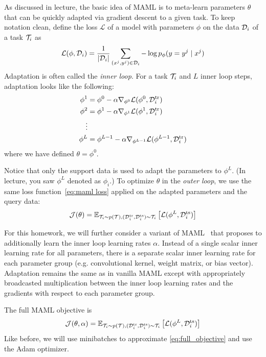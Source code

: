 As discussed in lecture, the basic idea of MAML is to meta-learn parameters $\theta$ that can be quickly adapted via gradient descent to a given task. To keep notation clean, define the loss $\mathcal{L}$ of a model with parameters $\phi$ on the data $\mathcal{D}_i$ of a task $\mathcal{T}_i$ as
\begin{equation}\label{eq:maml loss}
    \mathcal{L}(\phi, \mathcal{D}_i) = \frac{1}{\lvert \mathcal{D}_i \rvert} \sum_{(x^j, y^j) \in \mathcal{D}_i} -\log p_\phi (y = y^j \mid x^j)
\end{equation}
Adaptation is often called the \emph{inner loop}. For a task $\mathcal{T}_i$ and $L$ inner loop steps, adaptation looks like the following:
\begin{equation}
\begin{aligned}
    \phi^1 &= \phi^0 - \alpha \nabla_{\phi^0} \mathcal{L}(\phi^0, \mathcal{D}^\mathrm{tr}_i) \\
    \phi^2 &= \phi^1 - \alpha \nabla_{\phi^1} \mathcal{L}(\phi^1, \mathcal{D}^\mathrm{tr}_i) \\
    \vdots \\
    \phi^L &= \phi^{L-1} - \alpha \nabla_{\phi^{L-1}} \mathcal{L}(\phi^{L-1}, \mathcal{D}^\mathrm{tr}_i)
\end{aligned}
\end{equation}
where we have defined $\theta = \phi^0$.


Notice that only the support data is used to adapt the parameters to $\phi^L$. (In lecture, you saw $\phi^L$ denoted as $\phi_i$.) To optimize $\theta$ in the \emph{outer loop}, we use the same loss function~\eqref{eq:maml loss} applied on the adapted parameters and the query data:
\begin{equation}
    \mathcal{J}(\theta) = \mathbb{E}_{\mathcal{T}_i \sim p(\mathcal{T}), (\mathcal{D}^\mathrm{tr}_i, \mathcal{D}^\mathrm{ts}_i) \sim \mathcal{T}_i} \left[ \mathcal{L}(\phi^L, \mathcal{D}^\mathrm{ts}_i) \right] \label{eq:maml_objective}
\end{equation}


For this homework, we will further consider a variant of MAML~\cite{mamlplusplus} that proposes to additionally learn the inner loop learning rates $\alpha$. Instead of a single scalar inner learning rate for all parameters, there is a separate scalar inner learning rate for each parameter group (e.g. convolutional kernel, weight matrix, or bias vector). Adaptation remains the same as in vanilla MAML except with appropriately broadcasted multiplication between the inner loop learning rates and the gradients with respect to each parameter group. 

The full MAML objective is
\begin{equation}
    \mathcal{J}(\theta, \alpha) = \mathbb{E}_{\mathcal{T}_i \sim p(\mathcal{T}), (\mathcal{D}^\mathrm{tr}_i, \mathcal{D}^\mathrm{ts}_i) \sim \mathcal{T}_i} \left[ \mathcal{L}(\phi^L, \mathcal{D}^\mathrm{ts}_i) \right] \label{eq:full_objective}
\end{equation}
Like before, we will use minibatches to approximate \eqref{eq:full_objective} and use the Adam optimizer.

\begin{enumerate}[label={2.\alph*}]
    
    
    
    
\end{enumerate}

    